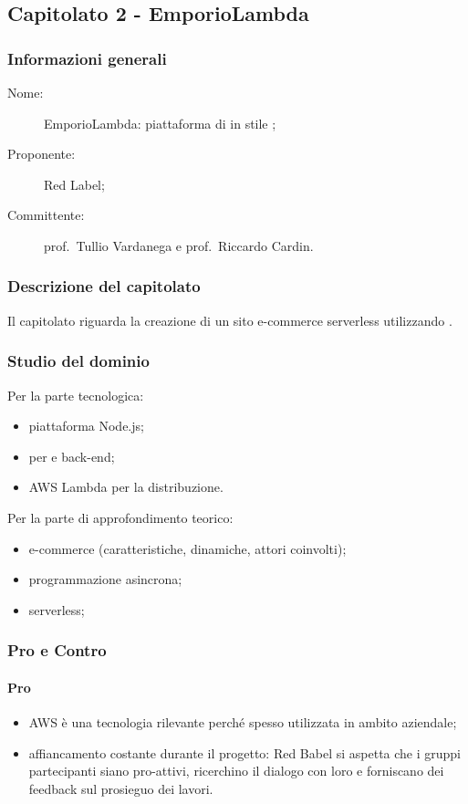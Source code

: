 \subsection{Capitolato 2 - EmporioLambda}
\subsubsection{Informazioni generali}
\begin{description}
	\item[Nome:] EmporioLambda: piattaforma di  in stile ;
	\item[Proponente:] Red Label;
	\item[Committente:] prof.~Tullio Vardanega e prof.~Riccardo Cardin.
\end{description}
\subsubsection{Descrizione del capitolato}
Il capitolato riguarda la creazione di un sito e-commerce serverless utilizzando .
\subsubsection{Studio del dominio}
Per la parte tecnologica:
\begin{itemize}
	\item piattaforma Node.js;
	\item {} per  e back-end;
	\item AWS Lambda per la distribuzione.
\end{itemize}
Per la parte di approfondimento teorico:
\begin{itemize}
	\item e-commerce (caratteristiche, dinamiche, attori coinvolti);
	\item programmazione asincrona;
	\item {} serverless;
\end{itemize}
\subsubsection{Pro e Contro}
\paragraph*{Pro}
\begin{itemize}
	\item AWS è una tecnologia rilevante perché spesso utilizzata in ambito aziendale;
	\item affiancamento costante durante il progetto: Red Babel si aspetta che i gruppi partecipanti siano pro-attivi, ricerchino il dialogo con loro e forniscano dei feedback sul prosieguo dei lavori.
\end{itemize}
